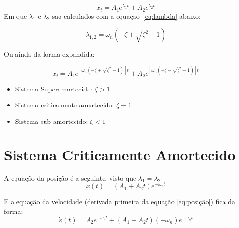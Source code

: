 \documentclass[a4paper,12pt]{article}
\begin{document}
\begin{equation}\label{eq:xt}
    x_{t}=A_{1} e^{\lambda_{1} t}+A_{2} e^{\lambda_{2} t}
\end{equation}
Em que $\lambda_1$ e $\lambda_2$ são calculados com a equação~\ref{eq:lambda}
abaixo:

\begin{equation}\label{eq:lambda}
\lambda_{1,2}=\omega_{n}\left(-\zeta\pm \sqrt{\zeta^{2}-1}\right)
\end{equation}

Ou ainda da forma expandida:

\begin{equation}\label{eq:xt_expandida}
x_{t}=A_{1} e^{\left[\omega_{n}(-\zeta+\sqrt{\zeta^{2}-1})\right] t}+A_{2} e^{\left[\omega_{n}(-\zeta-\sqrt{\zeta^{2}-1})\right] t}
\end{equation}

\begin{itemize}
    \item Sistema Superamortecido: $\zeta > 1$
    \item Sistema criticamente amortecido: $\zeta = 1$
    \item Sistema sub-amortecido: $\zeta < 1$
\end{itemize}

\section{Sistema Criticamente Amortecido}%
\label{sec:sistema_criticamente_amortecido}
A equação da posição é a seguinte, visto que $\lambda_1 = \lambda_2$
\begin{equation}\label{eq:posição}
x(t)=\left(A_{1}+A_{2} t\right) e^{-\omega_{n} t}
\end{equation}

E a equação da velocidade (derivada primeira da equação \ref{eq:posição})
fica da forma:
\begin{equation}
\dot{x}(t)=A_{2} e^{-\omega_{n} t}+\left(A_{1}+A_{2} t\right)\left(-\omega_{n}\right) e^{-\omega_{n} t}
\end{equation}
\end{document}
